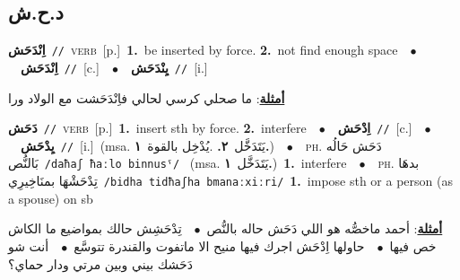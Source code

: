 \documentclass[10pt,a4paper,twoside]{article} %
\begin{document}
\begin{multicols}{2}
\vspace{-3mm}
\subsection*{\color{blue}\foreignlanguage{arabic}{د.ح.ش}\color{blue}{}} 

{\setlength\topsep{0pt}\textbf{\foreignlanguage{arabic}{اِنْدَحَش}}\ {\color{gray}\texttt{//}\color{black}}\ \textsc{verb}\ [p.]\ \textbf{1.}~be inserted by force.  \textbf{2.}~not find enough space\ \ $\bullet$\ \ \setlength\topsep{0pt}\textbf{\foreignlanguage{arabic}{اِنْدَحَش}}\ {\color{gray}\texttt{//}\color{black}}\ [c.]\ \ $\bullet$\ \ \setlength\topsep{0pt}\textbf{\foreignlanguage{arabic}{يِنْدَحَش}}\ {\color{gray}\texttt{//}\color{black}}\ [i.]\  \begin{flushright}\color{gray}\foreignlanguage{arabic}{\textbf{\underline{\foreignlanguage{arabic}{أمثلة}}}: ما صحلي كرسي لحالي فاِنْدَحَشت مع الولاد ورا}\end{flushright}\color{black}} \vspace{2mm}

{\setlength\topsep{0pt}\textbf{\foreignlanguage{arabic}{دَحَش}}\ {\color{gray}\texttt{//}\color{black}}\ \textsc{verb}\ [p.]\ \textbf{1.}~insert sth by force.  \textbf{2.}~interfere\ \ $\bullet$\ \ \setlength\topsep{0pt}\textbf{\foreignlanguage{arabic}{اِدْحَش}}\ {\color{gray}\texttt{//}\color{black}}\ [c.]\ \ $\bullet$\ \ \setlength\topsep{0pt}\textbf{\foreignlanguage{arabic}{يِدْحَش}}\ {\color{gray}\texttt{//}\color{black}}\ [i.]\ \color{gray}(msa. \foreignlanguage{arabic}{يَتَدَخَّل}~\foreignlanguage{arabic}{\textbf{٢.}}  .\foreignlanguage{arabic}{يُدْخِل بالقوة}~\foreignlanguage{arabic}{\textbf{١.}})\color{black}\ \ $\bullet$\ \ \textsc{ph.} \color{gray} \foreignlanguage{arabic}{دَحَش حَالُه بَالنُّص}\color{black}\ {\color{gray}\texttt{/{\sffamily daħaʃ ħaːlo binnusˤ}/}\color{black}}\ \color{gray} (msa. \foreignlanguage{arabic}{يَتَدَخَّل}~\foreignlanguage{arabic}{\textbf{١.}})\color{black}\ \textbf{1.}~interfere\ \ $\bullet$\ \ \textsc{ph.} \color{gray} \foreignlanguage{arabic}{بدهَا تِدْحَشْهَا بمنَاخِيرِي}\color{black}\ {\color{gray}\texttt{/{\sffamily bidha tidħaʃha bmanaːxiːri}/}\color{black}}\ \textbf{1.}~impose sth or a person (as a spouse) on sb\  \begin{flushright}\color{gray}\foreignlanguage{arabic}{\textbf{\underline{\foreignlanguage{arabic}{أمثلة}}}: أحمد ماخصُّه هو اللي دَحَش حاله بالنُّص\ $\bullet$\ \  تِدْحَشِش حالك بمواضيع ما الكاش خص فيها\ $\bullet$\ \  حاولها اِدْحَش اجرك فيها منيح الا ماتفوت والقندرة تتوسَّع\ $\bullet$\ \  أنت شو دَحَشك بيني وبين مرتي ودار حماي؟}\end{flushright}\color{black}} \vspace{2mm}


\end{multicols}
\end{document}
